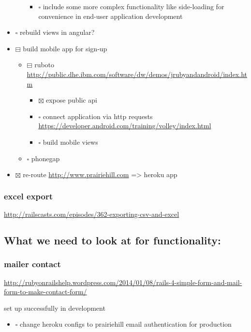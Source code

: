 \documentclass[11pt]{article}
\begin{document}
\begin{itemize}
\begin{itemize}
\begin{itemize}
\item $\square$ include some more complex functionality like side-loading for 
convenience in end-user application development
\end{itemize}
\end{itemize}
\item $\square$ rebuild views in angular?
\item $\boxminus$ build mobile app for sign-up
\begin{itemize}
\item $\boxminus$ ruboto
\url{http://public.dhe.ibm.com/software/dw/demos/jrubyandandroid/index.htm}
\begin{itemize}
\item $\boxtimes$ expose public api
\item $\square$ connect application via http requests
\url{https://developer.android.com/training/volley/index.html}
\item $\square$ build mobile views
\end{itemize}
\item $\square$ phonegap
\end{itemize}
\item $\boxtimes$ re-route \url{http://www.prairiehill.com} => heroku app
\end{itemize}

\subsubsection*{excel export}
\label{sec-1-1-1}

\url{http://railscasts.com/episodes/362-exporting-csv-and-excel}
\subsection*{What we need to look at for functionality:}
\label{sec-1-2}

\subsubsection*{mailer contact}
\label{sec-1-2-1}

\url{http://rubyonrailshelp.wordpress.com/2014/01/08/rails-4-simple-form-and-mail-form-to-make-contact-form/}

set up successfully in development

\begin{itemize}
\item $\square$ change heroku configs to prairiehill email authentication for production
\end{itemize}
\end{document}
